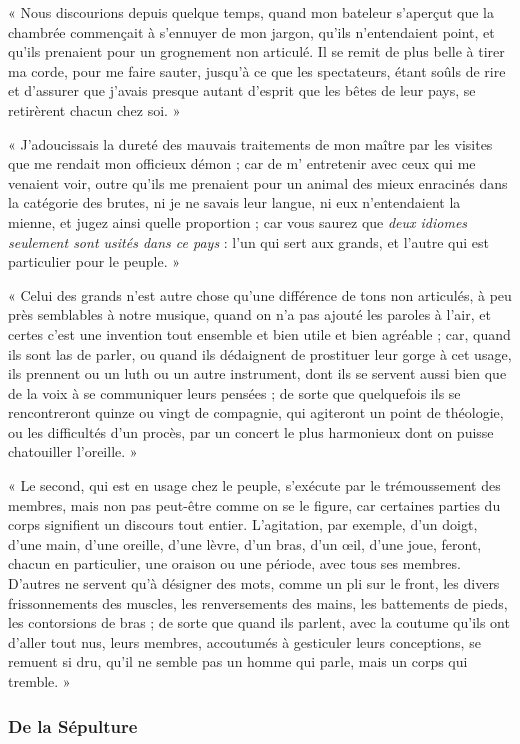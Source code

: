 \documentclass[a4paper, 11pt, oneside, landscape]{article}
\begin{document}
« Nous discourions depuis quelque temps, quand mon bateleur s'aperçut que la chambrée commençait à s'ennuyer de mon jargon, qu'ils n'entendaient point, et qu'ils prenaient pour un grognement non articulé. Il se remit de plus belle à tirer ma corde, pour me faire sauter, jusqu'à ce que les spectateurs, étant soûls de rire et d'assurer que j'avais presque autant d'esprit que les bêtes de leur pays, se retirèrent chacun chez soi. »

« J'adoucissais la dureté des mauvais traitements de mon maître par les visites que me rendait mon officieux démon ; car de m' entretenir avec ceux qui me venaient voir, outre qu'ils me prenaient pour un animal des mieux enracinés dans la catégorie des brutes, ni je ne savais leur langue, ni eux n'entendaient la mienne, et jugez ainsi quelle proportion ; car vous saurez que \emph{deux idiomes seulement sont usités dans ce pays} : l'un qui sert aux grands, et l'autre qui est particulier pour le peuple. »

« Celui des grands n'est autre chose qu'une différence de tons non articulés, à peu près semblables à notre musique, quand on n'a pas ajouté les paroles à l'air, et certes c'est une invention tout ensemble et bien utile et bien agréable ; car, quand ils sont las de parler, ou quand ils dédaignent de prostituer leur gorge à cet usage, ils prennent ou un luth ou un autre instrument, dont ils se servent aussi bien que de la voix à se communiquer leurs pensées ; de sorte que quelquefois ils se rencontreront quinze ou vingt de compagnie, qui agiteront un point de théologie, ou les difficultés d'un procès, par un concert le plus harmonieux dont on puisse chatouiller l'oreille. »

« Le second, qui est en usage chez le peuple, s'exécute par le trémoussement des membres, mais non pas peut-être comme on se le figure, car certaines parties du corps signifient un discours tout entier. L'agitation, par exemple, d'un doigt, d'une main, d'une oreille, d'une lèvre, d'un bras, d'un œil, d'une joue, feront, chacun en particulier, une oraison ou une période, avec tous ses membres. D'autres ne servent qu'à désigner des mots, comme un pli sur le front, les divers frissonnements des muscles, les renversements des mains, les battements de pieds, les contorsions de bras ; de sorte que quand ils parlent, avec la coutume qu'ils ont d'aller tout nus, leurs membres, accoutumés à gesticuler leurs conceptions, se remuent si dru, qu'il ne semble pas un homme qui parle, mais un corps qui tremble. »

\subsubsection{De la Sépulture}
\end{document}
